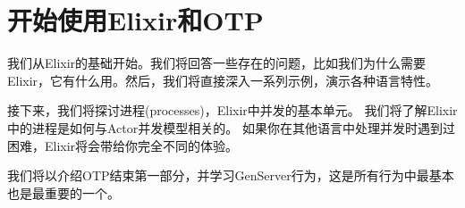 \part{开始使用Elixir和OTP}\label{part1}

我们从Elixir的基础开始。我们将回答一些存在的问题，比如我们为什么需要Elixir，它有什么用。然后，我们将直接深入一系列示例，演示各种语言特性。

接下来，我们将探讨进程(processes)，Elixir中并发的基本单元。
我们将了解Elixir中的进程是如何与Actor并发模型相关的。
如果你在其他语言中处理并发时遇到过困难，Elixir将会带给你完全不同的体验。

我们将以介绍OTP结束第一部分，并学习GenServer行为，这是所有行为中最基本也是最重要的一个。

